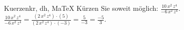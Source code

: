 \begin{MAufgabe}{Kuerzen}{kr, dh, MaTeX}
K\"urzen Sie soweit m\"oglich: $\frac{10\, x^2\, z^4}{- 6\, x^2\, z^4}$.\\ 
\ifLsg\MLoesung
\quad $\frac{10\, x^2\, z^4}{- 6\, x^2\, z^4}=\frac{(2\, x^2\, z^4)\cdot(5)}{(2\, x^2\, z^4)\cdot(-3)}=\frac{5}{-3}=\frac{-5}{3}$.\else\relax\fi
 \end{MAufgabe}
